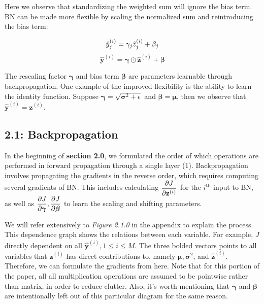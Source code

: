 \documentclass{article}
\begin{document}
\begin{multicols}{2}
Here we observe that standardizing the weighted sum will ignore the bias
term. BN can be made more flexible by scaling the normalized sum and 
reintroducing the bias term:

\begin{equation}
    \hat{y}_j^{(i)} = \gamma_j \hat{z}_j^{(i)} + \beta_j \notag
\end{equation}
\begin{equation}
    \hat{\textbf{y}}^{(i)} = \boldsymbol{\gamma} \odot \hat{\textbf{z}}^{(i)} + \boldsymbol{\beta} 
\end{equation}

The rescaling factor $\boldsymbol{\gamma}$ and bias term $\boldsymbol{\beta}$ are 
parameters learnable through backpropagation. One example of the improved
flexibility is the ability to learn the identity function. Suppose $\boldsymbol{\gamma} = \sqrt{\boldsymbol{\sigma}^2 + \epsilon}$
and $\boldsymbol{\beta} = \boldsymbol{\mu}$, then we observe that $\hat{\textbf{y}}^{(i)} = \textbf{z}^{(i)}$.







\subsection*{2.1: Backpropagation}

In the beginning of \textbf{section 2.0}, we formulated the order of which
operations are performed in forward propagation through a single layer (1). 
Backpropagation involves propagating the gradients in the reverse order, which
requires computing several gradients of BN. This includes calculating 
$\begin{aligned}
    {\partial J \over \partial \textbf{z}^{(i)}}
\end{aligned}$ for the $i^{\text{th}}$ input to BN, as well as $\begin{aligned}
    {\partial J \over \partial \boldsymbol{\gamma}}, {\partial J \over \partial \boldsymbol{\beta}}
\end{aligned}$ to learn the scaling and shifting parameters.

We will refer extensively to \textit{Figure 2.1.0} in the appendix 
to explain the process. This dependence graph shows the relations between 
each variable. For example, $J$ directly dependent on all $\hat{\textbf{y}}^{(i)}, 1 \leq i \leq M$.
The three bolded vectors points to all variables that $\textbf{z}^{(i)}$ has 
direct contributions to, namely $\boldsymbol{\mu}, \boldsymbol{\sigma}^2$, 
and $\hat{\textbf{z}}^{(i)}$. Therefore, we can formulate the gradients from here.
Note that for this portion of the paper, all all multiplication operations
are assumed to be pointwise rather than matrix, in order to reduce clutter.
Also, it's worth mentioning that $\boldsymbol{\gamma}$ and $\boldsymbol{\beta}$
are intentionally left out of this particular diagram for the same reason.


\end{multicols}
\end{document}
